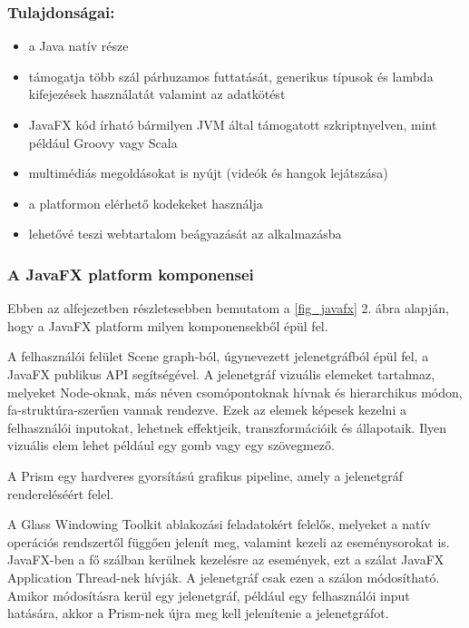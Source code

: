 \subsubsection*{Tulajdonságai:}
\begin{itemize}
\item a Java natív része 
\item támogatja több szál párhuzamos futtatását, generikus típusok és lambda kifejezések használatát valamint az adatkötést 
\item JavaFX kód írható bármilyen JVM által támogatott szkriptnyelven, mint például Groovy vagy Scala 
\item multimédiás megoldásokat is nyújt (videók és hangok lejátszása) 
\item a platformon elérhető kodekeket használja 
\item lehetővé teszi webtartalom beágyazását az alkalmazásba
\end{itemize}

\subsubsection*{A JavaFX platform komponensei}

Ebben az alfejezetben részletesebben bemutatom a \ref{fig_javafx} 2. ábra alapján, hogy a JavaFX platform milyen komponensekből épül fel. \cite{javafx, javafx4}



A felhasználói felület Scene graph-ból, úgynevezett jelenetgráfból épül fel, a JavaFX publikus API segítségével.
A jelenetgráf vizuális elemeket tartalmaz, melyeket Node-oknak, más néven csomópontoknak hívnak és hierarchikus módon, fa-struktúra-szerűen vannak rendezve.
Ezek az elemek képesek kezelni a felhasználói inputokat, lehetnek effektjeik, transzformációik és állapotaik.
Ilyen vizuális elem lehet például egy gomb vagy egy szövegmező. 

A Prism egy hardveres gyorsítású grafikus pipeline, amely a jelenetgráf rendereléséért felel.\cite{javafx2}

A Glass Windowing Toolkit ablakozási feladatokért felelős, melyeket a natív operációs rendszertől függően jelenít meg, valamint kezeli az eseménysorokat is.
JavaFX-ben a fő szálban kerülnek kezelésre az események, ezt a szálat JavaFX Application Thread-nek hívják.
A jelenetgráf csak ezen a szálon módosítható.
Amikor módosításra kerül egy jelenetgráf, például egy felhasználói input hatására, akkor a Prism-nek újra meg kell jelenítenie a jelenetgráfot.

